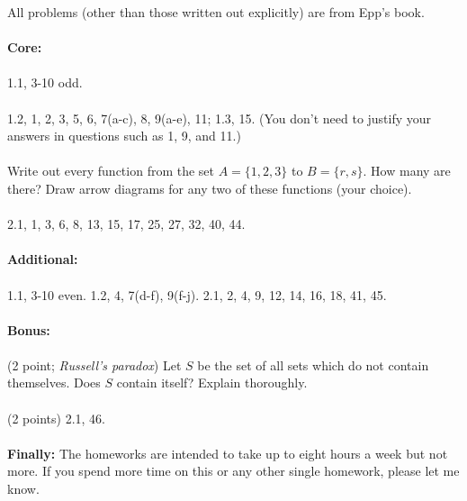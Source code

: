 \documentclass[12pt]{article}
\begin{document}
All problems (other than those written out explicitly) are from Epp's book.
\\
\\
{\bf Core:} 
\\
\\
1.1, 3-10 odd.
\\
\\
1.2, 1, 2, 3, 5, 6, 7(a-c), 8, 9(a-e), 11; 1.3, 15. (You don't need to justify your answers
in questions such as 1, 9, and 11.)
\\
\\
Write out every function from the set $A = \{1, 2, 3\}$ to $B = \{r, s\}$. How many
are there? Draw arrow diagrams for any two of these functions (your choice).
\\
\\
2.1, 1, 3, 6, 8, 13, 15, 17, 25, 27, 32, 40, 44.
\\
\\
{\bf Additional:}
\\
\\
1.1, 3-10 even. 1.2, 4, 7(d-f), 9(f-j). 2.1, 2, 4, 9, 12, 14, 16, 18, 41, 45.
\\
\\
{\bf Bonus:}
\\
\\
(2 point; {\itshape Russell's paradox}) Let $S$ be the set of all sets which do
not contain themselves. Does $S$ contain itself? Explain thoroughly.
\\
\\
(2 points) 2.1, 46.
\\
\\
{\bf Finally:} The homeworks are intended to take up to eight hours a week but not more.
If you spend more time on this or any other single homework, please let me know.
\end{document}
